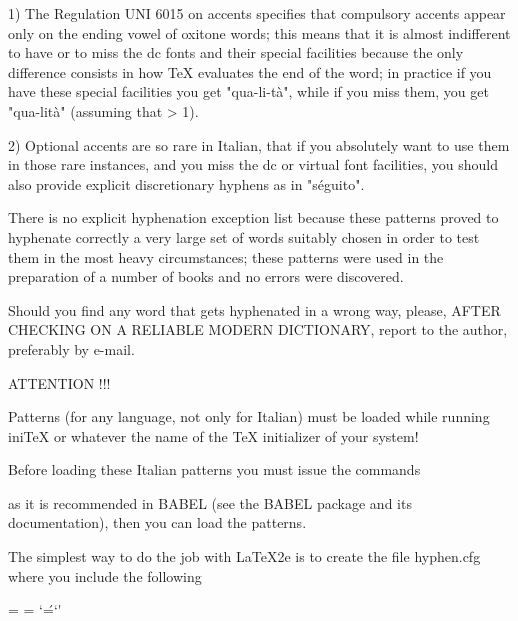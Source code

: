 1) The Regulation UNI 6015 on accents specifies that compulsory accents 
   appear only on the ending vowel of oxitone words; this means that it is 
   almost indifferent to have or to miss the dc fonts and their special 
   facilities because the only difference consists in how TeX evaluates the 
   end of the word; in practice if you have these special facilities you get
   "qua-li-t\`a", while if you miss them, you get "qua-lit\`a" (assuming
   that \righthyphenmin > 1).

2) Optional accents are so rare in Italian, that if you absolutely want 
   to use them in those rare instances, and you miss the dc or virtual font
   facilities, you should also provide explicit discretionary hyphens 
   as in "s\'e\-gui\-to".

There is no explicit hyphenation exception list because these patterns
proved to hyphenate correctly a very large set of words suitably chosen in
order to test them in the most heavy circumstances; these patterns were used
in the preparation of a number of books and no errors were discovered.

Should you find any word that gets hyphenated in a wrong way, please, AFTER
CHECKING ON A RELIABLE MODERN DICTIONARY, report to the author, preferably
by e-mail.

                      ATTENTION !!!

Patterns (for any language, not only for Italian) must be loaded while
running iniTeX or whatever the name of the TeX initializer of your system!

Before loading these Italian patterns you must issue the commands

\chardef{}
\newlanguage\l@italian

as it is recommended in BABEL (see the BABEL package and its documentation), 
then you can load the patterns.

The simplest way to do the job with LaTeX2e is to create the file hyphen.cfg
where you include the following

%
   {%
    \language=\l@english
    }%
   {%
    \@@end}
%
   {%
    \language=\l@italian
    \lccode`\'=`\'
    }%
   {%
    \@@end}

